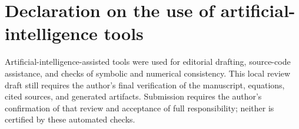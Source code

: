 \documentclass[aps,prd,reprint,superscriptaddress,nofootinbib,floatfix,showkeys]{revtex4-2}
\begin{document}
\section*{Declaration on the use of artificial-intelligence tools}

Artificial-intelligence-assisted tools were used for editorial drafting,
source-code assistance, and checks of symbolic and numerical consistency.
This local review draft still requires the author's final verification of
the manuscript, equations, cited sources, and generated artifacts. Submission
requires the author's confirmation of that review and acceptance of full
responsibility; neither is certified by these automated checks.


\end{document}
